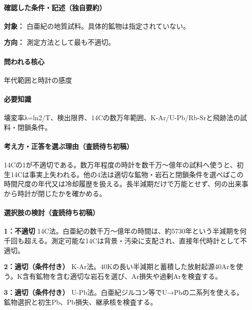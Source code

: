 \paragraph{確認した条件・記述（独自要約）}\mbox{}\par

\noindent\textbf{対象：} 白亜紀の地質試料。具体的鉱物は指定されていない。\par

\noindent\textbf{方向：} 測定方法として最も不適切。\par

\paragraph{問われる核心} 年代範囲と時計の感度

\paragraph{必要知識} 壊変率λ=ln2/T、検出限界、14Cの数万年範囲、K-Ar/U-Pb/Rb-Srと飛跡法の試料・閉鎖条件。

\paragraph{考え方・正答を選ぶ理由（査読待ち初稿）} 14Cの1が不適切である。数万年程度の時計を数千万〜億年の試料へ使うと、初生14Cは事実上失われる。他の4法は適切な鉱物・岩石と閉鎖条件を選べばこの時間尺度の年代又は冷却履歴を扱える。長半減期だけで万能とせず、何の出来事から時計が閉じたかを確かめる。

\paragraph{選択肢の検討（査読待ち初稿）}\mbox{}\par

\noindent\textbf{1：不適切} 14C法。白亜紀の数千万〜億年の時間は、約5730年という半減期を何千回も超える。測定可能な14Cは背景・汚染に支配され、直接年代時計として不適切。\par

\noindent\textbf{2：適切（条件付き）} K-Ar法。40Kの長い半減期と蓄積した放射起源40Arを使う。K含有鉱物を含む適切な岩石を選び、Ar損失や過剰Arを検査する。\par

\noindent\textbf{3：適切（条件付き）} U-Pb法。白亜紀ジルコン等でU→Pbの二系列を使える。鉱物選択と初生Pb、Pb損失、継承核を検査する。\par

